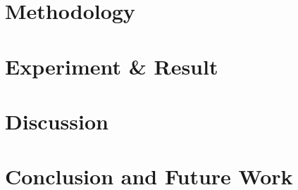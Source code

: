 \documentclass[12pt,a4paper]{report}
\begin{document}
\chapter{Methodology}
\newpage











\chapter{Experiment \& Result}
\newpage







\chapter{Discussion}
\newpage


\chapter{Conclusion and Future Work}
\newpage




\titleformat{\chapter}[display]
{\normalfont\huge\bfseries}{\chaptertitlename\ \thechapter}{20pt}{\Huge}
\titlespacing*{\chapter}{0pt}{50pt}{40pt}



\newpage
{}

\end{document}
